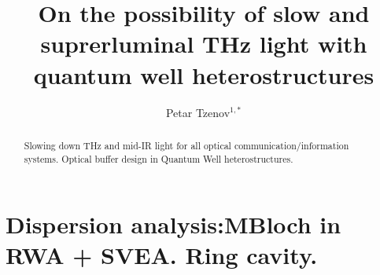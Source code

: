 \documentclass[10pt,letterpaper]{article}
\begin{document}
	
	\title{On the possibility of slow and suprerluminal THz light with quantum well heterostructures}
	
	\author{Petar Tzenov$^{1,*}$}
	
	\address{$^1$ Institute for Nanoelectronics, Technische Universit\''at M\''unchen, D-80333 Munich, Germany}
	\address{$^2$ Somewhere in MIT, US}
	
	
	
	
	\begin{abstract}
		Slowing down THz and mid-IR light for all optical communication/information systems. Optical buffer design in Quantum Well heterostructures.
	\end{abstract}
	
	
	\begin{thebibliography}{99}
		
	\end{thebibliography}
	
	\section{Dispersion analysis:MBloch in RWA + SVEA. Ring cavity.}
	
\end{document}
